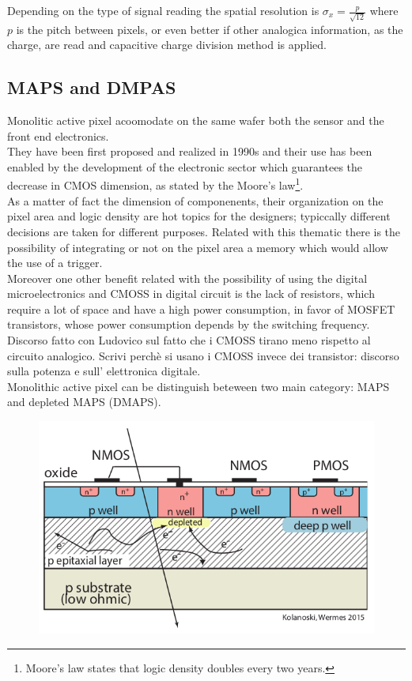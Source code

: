 \begin{titlepage}
Depending on the type of signal reading the spatial resolution is 
$\sigma_x = \frac{p}{\sqrt{12}}$ where $p$ is the pitch between pixels, or even better if other 
analogica information, as the charge, are read and capacitive charge division method is applied.


\subsection{MAPS and DMPAS}
Monolitic active pixel acoomodate on the same wafer both the sensor and the front
end electronics.\\
They have been first proposed and realized in 1990s and their use has been enabled
by the development of the electronic sector which guarantees the decrease in CMOS
dimension, as stated by the Moore's law\footnote{Moore's law states that logic
density doubles every two years.}.\\
As a matter of fact the dimension of componenents, their organization on the
pixel area and logic density are hot topics for the designers; typiccally
different decisions are taken for different purposes. Related with this thematic there is the possibility
of integrating or not on the pixel area a memory which would allow the use of a trigger. \\ 
Moreover one other benefit related with the possibility of using the digital microelectronics
and CMOSS in digital circuit is the lack of resistors, which require a lot of
space and have a high power consumption, in favor of MOSFET transistors, whose power
consumption depends by the switching frequency. Discorso fatto con Ludovico
sul fatto che i CMOSS tirano meno rispetto al circuito analogico.
Scrivi perchè si usano i CMOSS invece dei transistor: discorso sulla potenza e sull'
elettronica digitale.\\
Monolithic active pixel can be distinguish beteween two main category: MAPS and depleted
MAPS (DMAPS).\\
\begin{figure}
   \begin{minipage}{0.48\textwidth}
     \centering
     \includegraphics[width=.8\linewidth]{figures/MAPS_scheme.png}

\end{minipage}
\end{figure}
\end{titlepage}
